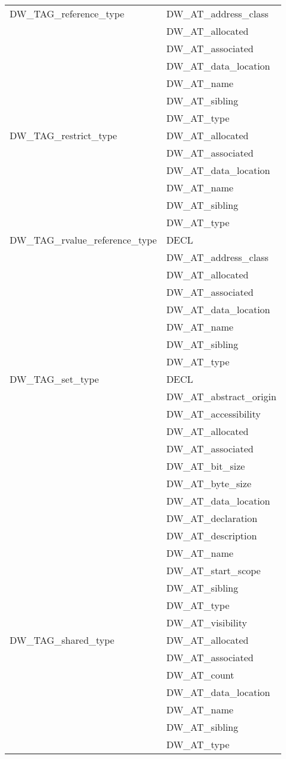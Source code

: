 \begin{longtable}{l|p{8cm}}
DW\_TAG\_reference\_type
&DW\_AT\_address\_class  \\
&DW\_AT\_allocated  \\
&DW\_AT\_associated  \\
&DW\_AT\_data\_location  \\
&DW\_AT\_name  \\
&DW\_AT\_sibling  \\
&DW\_AT\_type  \\

DW\_TAG\_restrict\_type
&DW\_AT\_allocated  \\
&DW\_AT\_associated  \\
&DW\_AT\_data\_location  \\
&DW\_AT\_name  \\
&DW\_AT\_sibling  \\
&DW\_AT\_type  \\

DW\_TAG\_rvalue\_reference\_type
&DECL  \\
&DW\_AT\_address\_class  \\
&DW\_AT\_allocated  \\
&DW\_AT\_associated  \\
&DW\_AT\_data\_location  \\
&DW\_AT\_name  \\
&DW\_AT\_sibling  \\
&DW\_AT\_type  \\


DW\_TAG\_set\_type
&DECL  \\
&DW\_AT\_abstract\_origin  \\
&DW\_AT\_accessibility  \\
&DW\_AT\_allocated  \\
&DW\_AT\_associated  \\
&DW\_AT\_bit\_size  \\
&DW\_AT\_byte\_size  \\
&DW\_AT\_data\_location  \\
&DW\_AT\_declaration  \\
&DW\_AT\_description  \\
&DW\_AT\_name  \\
&DW\_AT\_start\_scope  \\
&DW\_AT\_sibling  \\
&DW\_AT\_type  \\
&DW\_AT\_visibility  \\

DW\_TAG\_shared\_type
&DW\_AT\_allocated  \\
&DW\_AT\_associated  \\
&DW\_AT\_count  \\
&DW\_AT\_data\_location  \\
&DW\_AT\_name  \\
&DW\_AT\_sibling  \\
&DW\_AT\_type  \\



\end{longtable}
